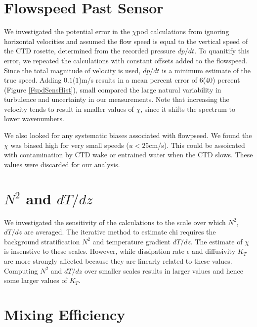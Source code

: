 \documentclass{ametsoc}
\begin{document}
\appendix[A]


\section{Flowspeed Past Sensor}

We investigated the potential error in the $\chi$pod calculations from ignoring horizontal velocities and assumed the flow speed is equal to the vertical speed of the CTD rosette, determined from the recorded pressure $dp/dt$. To quanitify this error, we repeated the calculations with constant offsets added to the flowspeed. Since the total magnitude of velocity is used, $dp/dt$ is a minimum estimate of the true speed. Adding $0.1$($1$)m/s results in a mean percent error of 6(40) percent (Figure \ref{FspdSensHist}), small compared the large natural variability in turbulence and uncertainty in our measurements. Note that increasing the velocity tends to result in smaller values of $\chi$, since it shifts the spectrum to lower wavenumbers. 

We also looked for any systematic biases associated with flowpseed. We found the $\chi$ was biased high for very small speeds ($u<25$cm/s). This could be assoicated with contamination by CTD wake or entrained water when the CTD slows.  These values were discarded for our analysis.



\section{$N^2$ and $dT/dz$}

We investigated the sensitivity of the calculations to the scale over which $N^2$, $dT/dz$ are averaged. The iterative method to estimate chi requires the background stratification $N^2$ and temperature gradient $dT/dz$. The estimate of $\chi$ is insenstive to these scales. However, while dissipation rate $\epsilon$ and diffusivity $K_T$ are more strongly affected because they are linearly related to these values. Computing $N^2$ and $dT/dz$ over smaller scales results in larger values and hence some larger values of $K_T$.

\section{Mixing Efficiency}
\end{document}
